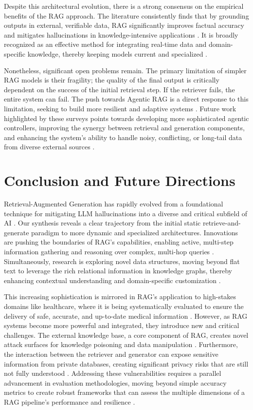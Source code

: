 \documentclass[11pt]{article}
\begin{document}
Despite this architectural evolution, there is a strong consensus on the empirical benefits of the RAG approach. The literature consistently finds that by grounding outputs in external, verifiable data, RAG significantly improves factual accuracy and mitigates hallucinations in knowledge-intensive applications . It is broadly recognized as an effective method for integrating real-time data and domain-specific knowledge, thereby keeping models current and specialized .

Nonetheless, significant open problems remain. The primary limitation of simpler RAG models is their fragility; the quality of the final output is critically dependent on the success of the initial retrieval step. If the retriever fails, the entire system can fail. The push towards Agentic RAG is a direct response to this limitation, seeking to build more resilient and adaptive systems \cite{ref20}. Future work highlighted by these surveys points towards developing more sophisticated agentic controllers, improving the synergy between retrieval and generation components, and enhancing the system's ability to handle noisy, conflicting, or long-tail data from diverse external sources .
\section{Conclusion and Future Directions}
Retrieval-Augmented Generation has rapidly evolved from a foundational technique for mitigating LLM hallucinations \cite{ref1}into a diverse and critical subfield of AI . Our synthesis reveals a clear trajectory from the initial static retrieve-and-generate paradigm to more dynamic and specialized architectures. Innovations are pushing the boundaries of RAG's capabilities, enabling active, multi-step information gathering \cite{ref3}and reasoning over complex, multi-hop queries \cite{ref6}. Simultaneously, research is exploring novel data structures, moving beyond flat text to leverage the rich relational information in knowledge graphs, thereby enhancing contextual understanding and domain-specific customization .

This increasing sophistication is mirrored in RAG's application to high-stakes domains like healthcare, where it is being systematically evaluated to ensure the delivery of safe, accurate, and up-to-date medical information . However, as RAG systems become more powerful and integrated, they introduce new and critical challenges. The external knowledge base, a core component of RAG, creates novel attack surfaces for knowledge poisoning and data manipulation \cite{ref15}. Furthermore, the interaction between the retriever and generator can expose sensitive information from private databases, creating significant privacy risks that are still not fully understood \cite{ref17}. Addressing these vulnerabilities requires a parallel advancement in evaluation methodologies, moving beyond simple accuracy metrics to create robust frameworks that can assess the multiple dimensions of a RAG pipeline's performance and resilience \cite{ref5}.
\end{document}

